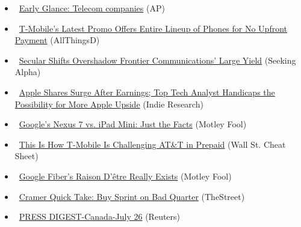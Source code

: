 \documentclass[11pt,asymmetric]{article}
\begin{document}
\begin{itemize}
\item\ \href{http://finance.yahoo.com/news/early-glance-telecom-companies-143418648.html}{Early Glance: Telecom companies} (AP)
\item\ \href{http://allthingsd.com/20130726/t-mobile-promotion-offers-entire-lineup-of-phones-for-no-upfront-payment/?reflink=ATD_yahoo_ticker}{T-Mobile's Latest Promo Offers Entire Lineup of Phones for No Upfront Payment} (AllThingsD)
\item\ \href{http://seekingalpha.com/article/1575462-secular-shifts-overshadow-frontier-communications-large-yield?source=yahoo}{Secular Shifts Overshadow Frontier Communications' Large Yield} (Seeking Alpha)
\item\ \href{http://finance.yahoo.com/news/apple-shares-surge-earnings-top-132200820.html}{Apple Shares Surge After Earnings; Top Tech Analyst Handicaps the Possibility for More Apple Upside} (Indie Research)
\item\ \href{http://www.fool.com/investing/general/2013/07/25/googles-nexus-7-vs-ipad-mini-just-the-facts.aspx?source=eogyholnk0000001}{Google's Nexus 7 vs. iPad Mini: Just the Facts} (Motley Fool)
\item\ \href{http://wallstcheatsheet.com/stocks/this-is-how-t-mobile-is-challenging-att-in-prepaid.html/?ref=YF}{This Is How T-Mobile Is Challenging AT\&T in Prepaid} (Wall St. Cheat Sheet)
\item\ \href{http://beta.fool.com/bluemarkanalysis/2013/07/25/google-fibers-raison-detre-really-exists/41566/?source=eogyholnk0000001}{Google Fiber's Raison D'être Really Exists} (Motley Fool)
\item\ \href{http://www.thestreet.com/story/11989816/1/cramer-quick-take-buy-sprint-on-bad-quarter.html?puc=yahoo&cm_ven=YAHOO}{Cramer Quick Take: Buy Sprint on Bad Quarter} (TheStreet)
\item\ \href{http://www.reuters.com/article/2013/07/26/press-digest-canada-idUSL4N0FW2LU20130726?feedType=RSS&feedName=marketsNews&rpc=43}{PRESS DIGEST-Canada-July 26} (Reuters)
\end{itemize}
\end{document}
